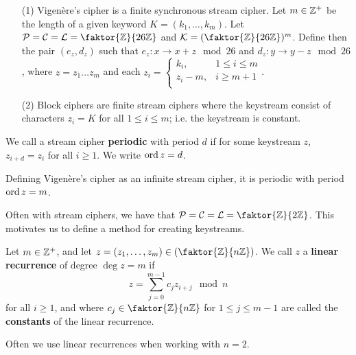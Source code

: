 \begin{example}
    \begin{enumerate}
        \item[(1)] Vigen\`ere's cipher is a finite synchronous stream cipher.
            Let $m \in \mathbb{Z}^+$ be the length of a given keyword  $K=
            (k_1, \dots, k_m)$. Let $\Pc=\Cc=\Lc=\faktor{\Z}{26\Z}$ and
            $\Kc=(\faktor{\Z}{26\Z})^m$. Define then the pair $(e_z,d_z)$ such
            that $e_z:x \rightarrow x+z \mod{26}$ and $d_z:y \rightarrow y-z
            \mod{26}$, where $z=z_1 \dots z_m$ and each
            $z_i=\begin{cases}
                    k_i,    & 1 \leq i \leq m \\
                    z_i-m,  & i \geq m+1 \\
                 \end{cases}$.

         \item[(2)] Block ciphers are finite stream ciphers where the keystream
             consist of characters $z_i=K$ for all  $1 \leq i \leq m$; i.e. the
             keystream is constant.
    \end{enumerate}
\end{example}

\begin{definition}
    We call a stream cipher \textbf{periodic} with period $d$ if for some
    keystream  $z$,  $z_{i+d}=z_i$ for all $i \geq 1$. We write  $\operatorname{ord}{z}=d$.
\end{definition}

\begin{example}
    Defining Vigen\`ere's cipher as an infinite stream cipher, it is periodic
    with period $\operatorname{ord}{z}=m$.
\end{example}

Often with stream ciphers, we have that $\Pc=\Cc=\Lc=\faktor{\Z}{2\Z}$. This
motivates us to define a method for creating keystreams.

\begin{definition}
    Let $m \in \mathbb{Z}^+$, and let  $z=(z_1, \dots, z_m) \in (\faktor{\Z}{n\Z})$. We
    call $z$ a  \textbf{linear recurrence} of degree $\deg{z}=m$ if
    \begin{equation}
        z=\sum_{j=0}^{m-1}{c_jz_{i+j}} \mod{n}
    \end{equation}
    for all $i \geq 1$, and where  $c_j \in \faktor{\Z}{n\Z}$ for $1 \leq j \leq
    m-1$ are called the \textbf{constants} of the linear recurrence.
\end{definition}
\begin{remark}
    Often we use linear recurrences when working with $n=2$.
\end{remark}

